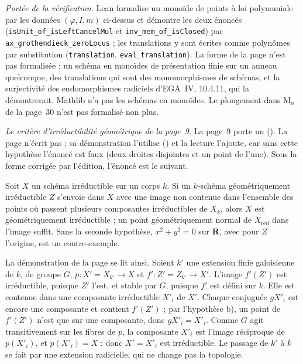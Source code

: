 \begingroup\raggedright
\noindent\emph{Portée de la vérification.} Lean formalise un monoïde de points à loi polynomiale par les données $(\varphi, I, m)$ ci-dessus et démontre les deux énoncés (\texttt{isUnit\_of\_isLeftCancelMul} et \texttt{inv\_mem\_of\_isClosed}) par \texttt{ax\_grothendieck\_zeroLocus} ; les translations y sont écrites comme polynômes par substitution (\texttt{translation}, \texttt{eval\_translation}). La forme de la page n'est pas formalisée : un schéma en monoïdes de présentation finie sur un anneau quelconque, des translations qui sont des monomorphismes de schémas, et la surjectivité des endomorphismes radiciels d'EGA~IV, 10.4.11, qui la démontrerait. Mathlib n'a pas les schémas en monoïdes. Le plongement dans $\mathrm M_n$ de la page~30 n'est pas formalisé non plus.\par\endgroup

\noindent\emph{Le critère d'irréductibilité géométrique de la page~9.} La page~9 porte un  (). La page n'écrit pas  ; sa démonstration l'utilise () et la lecture l'ajoute, car sans cette hypothèse l'énoncé est faux (deux droites disjointes et un point de l'une). Sous la forme corrigée par l'édition, l'énoncé est le suivant.

\begin{encadre}
\begin{theoreme*}
Soit $X$ un schéma irréductible sur un corps $k$. Si un $k$-schéma géométriquement irréductible $Z$ s'envoie dans $X$ avec une image non contenue dans l'ensemble des points où passent plusieurs composantes irréductibles de $X_{\bar k}$, alors $X$ est géométriquement irréductible ; un point géométriquement normal de $X_{\mathrm{red}}$ dans l'image suffit. Sans la seconde hypothèse, $x^2 + y^2 = 0$ sur $\mathbf R$, avec pour $Z$ l'origine, est un contre-exemple.
\end{theoreme*}
\end{encadre}

La démonstration de la page se lit ainsi. Soient $k'$ une extension finie galoisienne de $k$, de groupe $G$, $p : X' = X_{k'} \to X$ et $f' : Z' = Z_{k'} \to X'$. L'image $f'(Z')$ est irréductible, puisque $Z'$ l'est, et stable par $G$, puisque $f'$ est défini sur $k$. Elle est contenue dans une composante irréductible $X'_i$ de $X'$. Chaque conjuguée $g X'_i$ est encore une composante et contient $f'(Z')$ ; par l'hypothèse b), un point de $f'(Z')$ n'est que sur une composante, donc $g X'_i = X'_i$. Comme $G$ agit transitivement sur les fibres de $p$, la composante $X'_i$ est l'image réciproque de $p(X'_i)$, et $p(X'_i) = X$ ; donc $X' = X'_i$ est irréductible. Le passage de $k'$ à $\bar k$ se fait par une extension radicielle, qui ne change pas la topologie.

